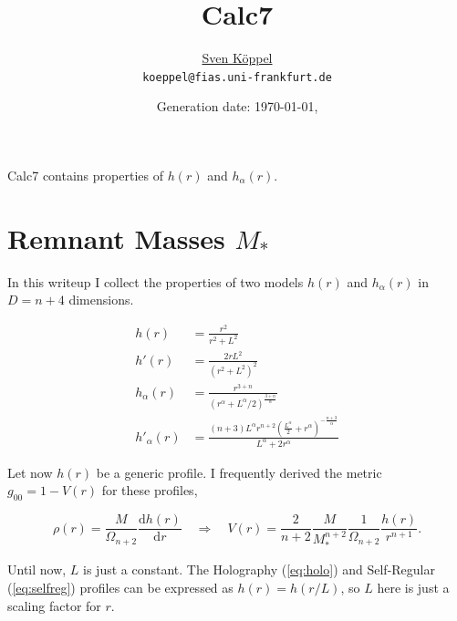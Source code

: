 \documentclass[10pt,a4paper, fleqn]{article}
\title{\vspace{-9ex} Calc7 \vspace{-1ex}} %
\author{\small %
\href{https://itp.uni-frankfurt.de/~koeppel}{Sven Köppel} \\
\small \texttt{koeppel@fias.uni-frankfurt.de}}
\date{\small Generation date: \today, \currenttime}
\begin{document}
\maketitle

\renewcommand{\d}{\mathrm{d}}
\newcommand{\dd}[2]{\frac{\mathrm{d} #1}{\mathrm{d} #2}}
\newcommand{\pp}[2]{\frac{\partial #1}{\partial #2}}
\renewcommand{\L}{L_P}
\newcommand{\pr}{p_r}
\newcommand{\psenk}{p_\perp}
\newcommand{\ebenso}{\biggl( ~ \therefore ~ \biggr) }
\newcommand{\metrik}[1]{\d s^2 = \left( #1 \right) \d t^2 \left( #1 \right)^{-1} \d r^2 + r^2 \d \Omega_{D-2}^2 }
\newcommand{\winkel}{r^2 \d \Omega^2}
\newcommand{\dann}{$\rightarrow~$}

\begin{multicols}{2}
Calc7 contains properties of $h(r)$ and $h_\alpha(r)$.


\columnbreak
\tableofcontents
\end{multicols}

\section{Remnant Masses $M_*$}
In this writeup I collect the properties of two models $h(r)$ and $h_\alpha(r)$ in $D=n+4$ dimensions.

\begin{align}
h(r) &= \frac{r^2}{r^2 + L^2} \label{eq:holo} \\
h'(r) &= \frac{2rL^2}{(r^2 + L^2)^2} \\
h_\alpha(r) &= \frac{r^{3+n}}{(r^\alpha + L^\alpha/2)^{\frac{3+n}{\alpha}}} \label{eq:selfreg} \\
h'_\alpha(r) &= \frac{(n+3) L^{\alpha } r^{n+2}
   \left(\frac{L^{\alpha
   }}{2}+r^{\alpha
   }\right)^{-\frac{n+3}{\alpha
   }}}{L^{\alpha }+2 r^{\alpha
   }}
\end{align}

Let now $h(r)$ be a generic profile. I frequently derived the metric $g_{00}=1-V(r)$ for these profiles,

\begin{equation}
\rho(r) = \frac M {\Omega_{n+2}} \dd{h(r)}r \quad\Rightarrow\quad
V(r) = \frac{2}{n+2} \frac{M}{M_*^{n+2}} {\frac{1}{\Omega_{n+2}}} \frac{h(r)}{r^{n+1}}.  \label{eq:start}
\end{equation}

Until now, $L$ is just a constant. The Holography (\ref{eq:holo}) and Self-Regular (\ref{eq:selfreg}) profiles can be expressed as $h(r)=h(r/L)$, so $L$ here is just a scaling factor for $r$.
\end{document}
